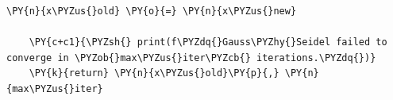 \begin{Verbatim}[commandchars=\\\{\}]
        \PY{n}{x\PYZus{}old} \PY{o}{=} \PY{n}{x\PYZus{}new}
        
    \PY{c+c1}{\PYZsh{} print(f\PYZdq{}Gauss\PYZhy{}Seidel failed to converge in \PYZob{}max\PYZus{}iter\PYZcb{} iterations.\PYZdq{})}
    \PY{k}{return} \PY{n}{x\PYZus{}old}\PY{p}{,} \PY{n}{max\PYZus{}iter}
\end{Verbatim}
